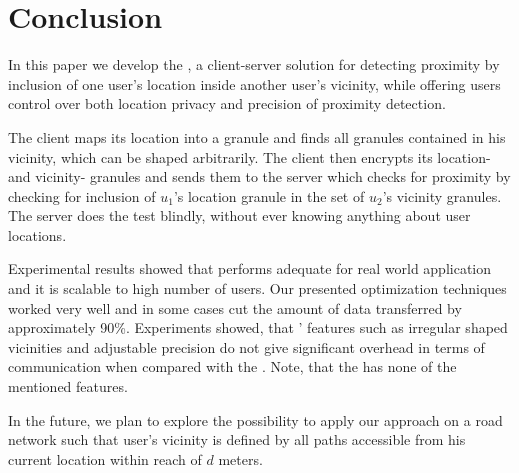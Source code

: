 \section{Conclusion}
In this paper we develop the \vl, a client-server solution for detecting
proximity by inclusion of one user's location inside another user's vicinity, 
while offering users control over both location privacy and precision of 
proximity detection.

The client maps its location into a granule and finds all granules contained 
in his vicinity, which can be shaped arbitrarily. The client
then encrypts its location- and vicinity- granules and sends them to the server
which checks for proximity by checking for inclusion of $u_1$'s location granule
in the set of $u_2$'s vicinity granules. The server does the test blindly, without ever
knowing anything about user locations.

Experimental results showed that \vl performs adequate for real world application
and it is scalable to high number of users.  Our presented optimization
techniques worked very well and in some cases cut the amount of data transferred by
approximately 90\%. Experiments showed, that \vl' features such
as irregular shaped vicinities and adjustable precision do not give significant
overhead in terms of communication when compared with the \ff. Note, that the
\ff has none of the mentioned features.

In the future, we plan to explore the possibility to apply our approach on a 
road network such that user's vicinity is defined by all paths accessible from his 
current location within reach of $d$ meters. 
